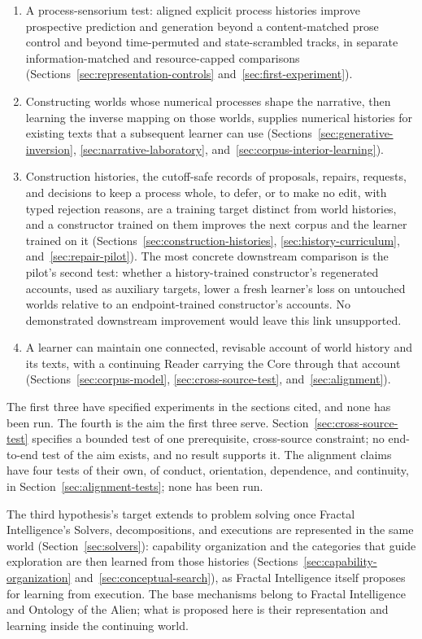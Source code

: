 \documentclass[10pt]{article}
\begin{document}
\begin{enumerate}[nosep]
\item A process-sensorium test: aligned explicit process histories
  improve prospective prediction and generation beyond a content-matched prose control and beyond time-permuted
  and state-scrambled tracks, in separate information-matched and
  resource-capped comparisons
  (Sections~\ref{sec:representation-controls} and~\ref{sec:first-experiment}).
\item Constructing worlds whose numerical processes shape the narrative, then
  learning the inverse mapping on those worlds, supplies numerical histories
  for existing texts that a subsequent learner can use
  (Sections~\ref{sec:generative-inversion}, \ref{sec:narrative-laboratory},
  and~\ref{sec:corpus-interior-learning}).
\item Construction histories, the cutoff-safe records of proposals, repairs,
  requests, and decisions to keep a process whole, to defer, or to make no
  edit, with typed rejection reasons, are a training
  target distinct from world histories, and a constructor trained on them
  improves the next corpus and the learner trained on it
  (Sections~\ref{sec:construction-histories}, \ref{sec:history-curriculum},
  and~\ref{sec:repair-pilot}). The most concrete downstream comparison is the
  pilot's second test: whether a history-trained constructor's regenerated
  accounts, used as auxiliary targets, lower a fresh learner's loss on
  untouched worlds relative to an endpoint-trained constructor's accounts. No
  demonstrated downstream improvement would leave this link unsupported.
\item A learner can maintain one connected, revisable account of world history
  and its texts, with a continuing Reader carrying the Core through that
  account (Sections~\ref{sec:corpus-model}, \ref{sec:cross-source-test},
  and~\ref{sec:alignment}).
\end{enumerate}
The first three have specified experiments in the sections cited, and none has
been run. The fourth is the aim the first three serve.
Section~\ref{sec:cross-source-test} specifies a bounded test of one
prerequisite, cross-source constraint; no end-to-end test of the aim exists,
and no result supports it. The alignment claims have four tests of their own,
of conduct, orientation, dependence, and continuity, in
Section~\ref{sec:alignment-tests}; none has been run.

The third hypothesis's target extends to problem solving once Fractal
Intelligence's Solvers, decompositions, and executions are represented in the
same world (Section~\ref{sec:solvers}): capability organization and the
categories that guide exploration are then learned from those histories
(Sections~\ref{sec:capability-organization} and~\ref{sec:conceptual-search}),
as Fractal Intelligence itself proposes for learning from execution. The base
mechanisms belong to Fractal Intelligence and Ontology of the Alien; what is
proposed here is their representation and learning inside the continuing world.
\end{document}
